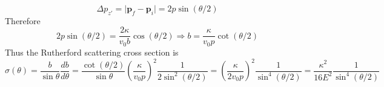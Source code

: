 \documentclass[aps,prb,onecolumn,notitlepage,showpacs,floatfix,superscriptaddress]{revtex4-1}
\begin{document}
\begin{equation}
\Delta p_{z'} = \vert{\bm p}_f -{\bm p}_i \vert = 2 p \sin(\theta/2)
\end{equation}
Therefore
\begin{equation}
 2 p \sin(\theta/2) =  \dfrac{2\kappa}{v_0 b} \cos(\theta/2) \Rightarrow b = \dfrac{\kappa}{v_0 p} \cot(\theta/2)
\end{equation}
Thus the Rutherford scattering cross section is
\begin{equation}
\sigma(\theta) = \dfrac{b}{\sin\theta} \dfrac{db}{d\theta} =  \dfrac{\cot(\theta/2)}{\sin\theta}  \left(\dfrac{\kappa}{v_0 p}\right)^2 \dfrac{1}{2\sin^2(\theta/2)} = \left(\dfrac{\kappa}{2 v_0 p}\right)^2 \dfrac{1}{\sin^4(\theta/2)} = \dfrac{\kappa^2}{16 E^2} \dfrac{1}{\sin^4(\theta/2)}
\end{equation}
\end{document}
